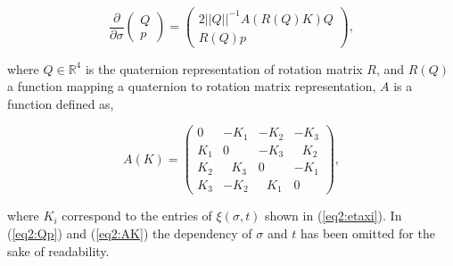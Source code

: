 \begin{equation}
\frac{\partial}{\partial \sigma}    \begin{pmatrix} Q \\ p \end{pmatrix} = \begin{pmatrix} 2 ||Q||^{-1} A(R(Q)K)Q \\ R(Q)p \end{pmatrix},
\label{eq2:Qp}
\end{equation}

where $Q \in \mathbb{R}^4$ is the quaternion representation of rotation matrix $R$, and $R(Q)$ a function mapping a quaternion to rotation matrix representation, $A$ is a function defined as,


\begin{equation}
    A(K) = \begin{pmatrix} 0 & -K_1 & -K_2 & -K_3 \\ K_1 & 0 & -K_3 & \hspace{8pt}K_2 \\ K_2 & \hspace{8pt}K_3 & 0 & -K_1 \\ K_3 & -K_2 & \hspace{8pt}K_1 & 0 \end{pmatrix},
    \label{eq2:AK}
\end{equation}

where $K_i$ correspond to the entries of $\xi(\sigma,t)$ shown in (\ref{eq2:etaxi}). In  (\ref{eq2:Qp}) and (\ref{eq2:AK}) the dependency of $\sigma$ and $t$ has been omitted for the sake of readability.



